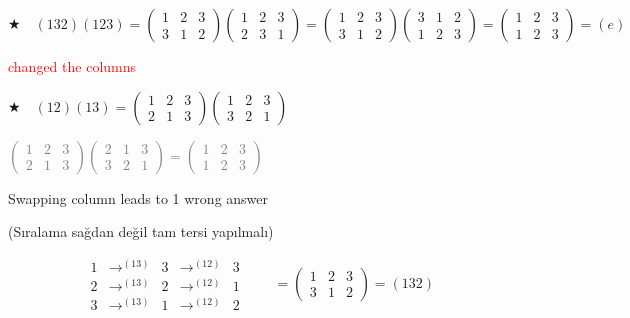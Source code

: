 \documentclass[12pt,a4paper]{article}
\newcommand{\pmtx}[2]{\begin{pmatrix}#1\\#2\end{pmatrix}}
\begin{document}
\begin{flushleft}
\(\bigstar\quad (132)(123)=
\pmtx{1&2&3}{3&1&2}
\pmtx{1&2&3}{2&3&1}
=
\pmtx{1&2&3}{3&1&2}
\pmtx{3&1&2}{1&2&3}
=
\pmtx{1&2&3}{1&2&3}=(e)\)

\begin{center}
\textcolor{red}{\large changed the columns}
\end{center}

\vspace{0.4em}
\(\bigstar\quad (12)(13)=
\pmtx{1&2&3}{2&1&3}
\pmtx{1&2&3}{3&2&1}\)

\begin{center}
\textcolor{gray}{\(\pmtx{1&2&3}{2&1&3}\pmtx{2&1&3}{3&2&1}
=\pmtx{1&2&3}{1&2&3}\)}
\end{center}

\begin{center}
\textcolor{green!45!black}{\large Swapping column leads to 1 wrong answer}

\textcolor{green!45!black}{(Sıralama sağdan değil tam tersi yapılmalı)}
\end{center}

\[
\begin{array}{rclclcl}
1&\longrightarrow^{(13)}&3&\longrightarrow^{(12)}&3\\[0.3em]
2&\longrightarrow^{(13)}&2&\longrightarrow^{(12)}&1\\[0.3em]
3&\longrightarrow^{(13)}&1&\longrightarrow^{(12)}&2
\end{array}
\qquad
=\pmtx{1&2&3}{3&1&2}=(132)
\]
\end{flushleft}
\end{document}
